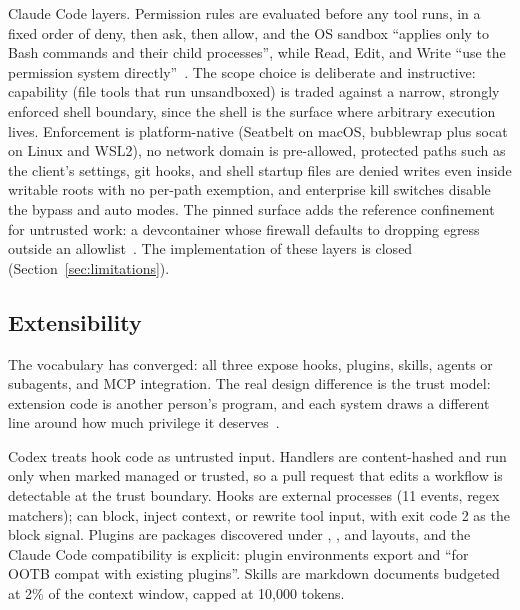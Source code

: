 \documentclass{article}
\newcommand{\codex}[0]{Codex}
\newcommand{\ccc}[0]{Claude Code}
\begin{document}
\ccc{} layers. Permission rules are evaluated before any tool runs, in a
fixed order of deny, then ask, then allow, and the OS sandbox ``applies
only to Bash commands and their child processes'', while Read, Edit, and
Write ``use the permission system
directly''~\citep{claudeCodeDocsPermissions,claudeCodeDocsSandboxing,%
claudeCodeDocsHooks}. The scope choice is deliberate and instructive:
capability (file tools that run unsandboxed) is traded against a narrow,
strongly enforced shell boundary, since the shell is the surface where
arbitrary execution lives. Enforcement is platform-native
(Seatbelt on macOS, bubblewrap plus socat on Linux and WSL2), no network
domain is pre-allowed, protected paths such as the client's settings, git
hooks, and shell startup files are denied writes even inside writable
roots with no per-path exemption, and enterprise kill switches disable
the bypass and auto modes. The pinned surface adds the reference
confinement for untrusted work: a devcontainer whose firewall defaults to
dropping egress outside an allowlist~\citep{claudeCodePluginSurface}. The
implementation of these layers is closed (Section~\ref{sec:limitations}).

\subsection{Extensibility}
\label{sec:extensibility}

The vocabulary has converged: all three expose hooks, plugins, skills,
agents or subagents, and MCP integration. The real design difference is
the trust model: extension code is another person's program, and each
system draws a different line around how much privilege it
deserves~\citep{codexRepo,opencodeRepo,claudeCodeDocsPlugins}.

\codex{} treats hook code as untrusted input. Handlers are content-hashed
and run only when marked managed or trusted, so a pull request that edits
a workflow is detectable at the trust boundary. Hooks are external
processes (11 events, regex matchers);  can block,
inject context, or rewrite tool input, with exit code 2 as the block
signal. Plugins are  packages discovered
under , , and
 layouts, and the \ccc{} compatibility is explicit:
plugin environments export  and
 ``for OOTB compat with existing plugins''.
Skills are markdown documents budgeted at 2\% of the context window,
capped at 10{,}000 tokens.
\end{document}
